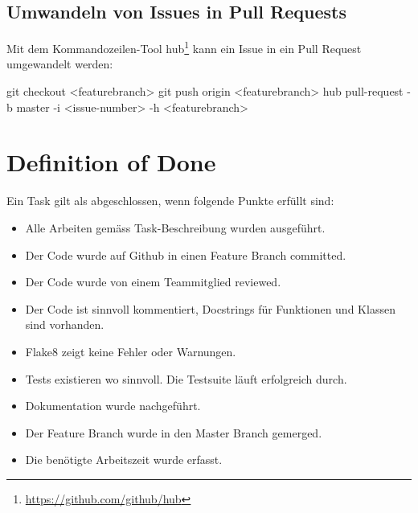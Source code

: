 \subsection{Umwandeln von Issues in Pull Requests}

Mit dem Kommandozeilen-Tool hub\footnote{\url{https://github.com/github/hub}}
kann ein Issue in ein Pull Request umgewandelt werden:

\begin{bashcode}
git checkout <featurebranch>
git push origin <featurebranch>
hub pull-request -b master -i <issue-number> -h <featurebranch>
\end{bashcode}




\section{Definition of Done}

Ein Task gilt als abgeschlossen, wenn folgende Punkte erfüllt sind:

\begin{itemize}
	\item Alle Arbeiten gemäss Task-Beschreibung wurden ausgeführt.
	\item Der Code wurde auf Github in einen Feature Branch committed.
	\item Der Code wurde von einem Teammitglied reviewed.
	\item Der Code ist sinnvoll kommentiert, Docstrings für Funktionen und Klassen sind vorhanden.
	\item Flake8 zeigt keine Fehler oder Warnungen.
	\item Tests existieren wo sinnvoll. Die Testsuite läuft erfolgreich durch.
	\item Dokumentation wurde nachgeführt.
	\item Der Feature Branch wurde in den Master Branch gemerged.
	\item Die benötigte Arbeitszeit wurde erfasst.
\end{itemize}
